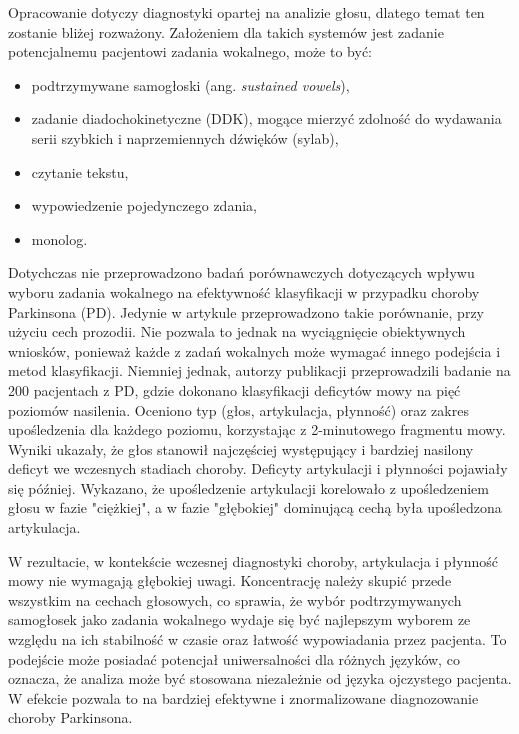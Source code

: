 Opracowanie dotyczy diagnostyki opartej na analizie głosu, dlatego temat ten zostanie bliżej rozważony.
Założeniem dla takich systemów jest zadanie potencjalnemu pacjentowi zadania wokalnego, może to być:
\begin{itemize}[itemsep=0.1pt]
	\item podtrzymywane samogłoski (ang. \emph{sustained vowels}),
	\item zadanie diadochokinetyczne (DDK), mogące mierzyć zdolność do wydawania serii szybkich i naprzemiennych dźwięków (sylab),
	\item czytanie tekstu,
	\item wypowiedzenie pojedynczego zdania,
	\item monolog.
\end{itemize}

Dotychczas nie przeprowadzono badań porównawczych dotyczących wpływu wyboru zadania wokalnego na efektywność klasyfikacji w przypadku choroby Parkinsona (PD).
Jedynie w artykule  \cite{vocal_task_comparision} przeprowadzono takie porównanie, przy użyciu cech prozodii.
Nie pozwala to jednak na wyciągnięcie obiektywnych wniosków, ponieważ każde z zadań wokalnych może wymagać innego podejścia i metod klasyfikacji.
Niemniej jednak, autorzy publikacji \cite{monitoring_speech} przeprowadzili badanie na 200 pacjentach z PD,
gdzie dokonano klasyfikacji deficytów mowy na pięć poziomów nasilenia.
Oceniono typ (głos, artykulacja, płynność) oraz zakres upośledzenia dla każdego poziomu, korzystając z 2-minutowego fragmentu mowy.
Wyniki ukazały, że głos stanowił najczęściej występujący i bardziej nasilony deficyt we wczesnych stadiach choroby.
Deficyty artykulacji i płynności pojawiały się później.
Wykazano, że upośledzenie artykulacji korelowało z upośledzeniem głosu w fazie "ciężkiej", a w fazie "głębokiej" dominującą cechą była upośledzona artykulacja.

W rezultacie, w kontekście wczesnej diagnostyki choroby, artykulacja i płynność mowy nie wymagają głębokiej uwagi.
Koncentrację należy skupić przede wszystkim na cechach głosowych, co sprawia, że wybór podtrzymywanych samogłosek jako zadania wokalnego
wydaje się być najlepszym wyborem ze względu na ich stabilność w czasie oraz łatwość wypowiadania przez pacjenta.
To podejście może posiadać potencjał uniwersalności dla różnych języków, co oznacza, że analiza może być stosowana
niezależnie od języka ojczystego pacjenta.
W efekcie pozwala to na bardziej efektywne i znormalizowane diagnozowanie choroby Parkinsona.

